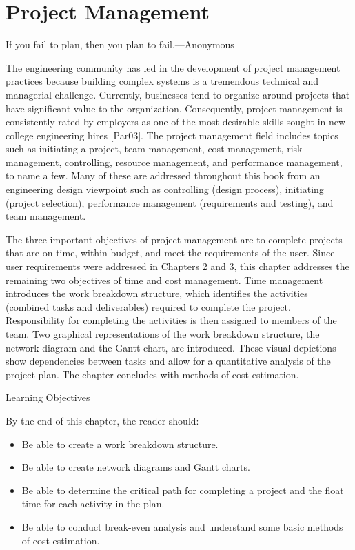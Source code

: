 \section{\texorpdfstring{ Project
Management}{ Project Management}}\label{project-management}

If you fail to plan, then you plan to fail.---Anonymous

The engineering community has led in the development of project
management practices because building complex systems is a tremendous
technical and managerial challenge. Currently, businesses tend to
organize around projects that have significant value to the
organization. Consequently, project management is consistently rated by
employers as one of the most desirable skills sought in new college
engineering hires {[}Par03{]}. The project management field includes
topics such as initiating a project, team management, cost management,
risk management, controlling, resource management, and performance
management, to name a few. Many of these are addressed throughout this
book from an engineering design viewpoint such as controlling (design
process), initiating (project selection), performance management
(requirements and testing), and team management.

The three important objectives of project management are to complete
projects that are on-time, within budget, and meet the requirements of
the user. Since user requirements were addressed in Chapters 2 and 3,
this chapter addresses the remaining two objectives of time and cost
management. Time management introduces the work breakdown structure,
which identifies the activities (combined tasks and deliverables)
required to complete the project. Responsibility for completing the
activities is then assigned to members of the team. Two graphical
representations of the work breakdown structure, the network diagram and
the Gantt chart, are introduced. These visual depictions show
dependencies between tasks and allow for a quantitative analysis of the
project plan. The chapter concludes with methods of cost estimation.

Learning Objectives

By the end of this chapter, the reader should:

\begin{itemize}
\item
  Be able to create a work breakdown structure.
\item
  Be able to create network diagrams and Gantt charts.
\item
  Be able to determine the critical path for completing a project and
  the float time for each activity in the plan.
\item
  Be able to conduct break-even analysis and understand some basic
  methods of cost estimation.
\end{itemize}

